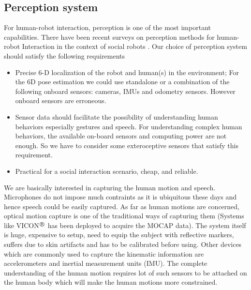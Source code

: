 \subsection{Perception system}
\label{ssec:perception}
For human-robot interaction, perception is one of the most important capabilities. There have been recent surveys on perception methods for human-robot Interaction in the context of social robots \cite{yan2014survey}. Our choice of perception system should satisfy the following requirements
\begin{itemize}
\item Precise 6-D localization of the robot and human(s) in the environment; For the 6D pose estimation we could use standalone or a combination of the following onboard sensors: cameras, IMUs and odometry sensors. However onboard sensors are erroneous.
\item Sensor data should facilitate the possibility of understanding human behaviors especially gestures and speech. For understanding complex human behaviors, the available on-board sensors and computing power are not enough. So we have to consider some exteroceptive sensors that satisfy this requirement. 
\item Practical for a social interaction scenario, cheap, and reliable.
\end{itemize}
We are basically interested in capturing the human motion and speech. Microphones do not impose much contraints as it is ubiquitous these days and hence speech could be easily captured. As far as human motions are concerned, optical motion capture is one of the traditional ways of capturing them (Systems like VICON$^{\regmark}$ has been deployed to acquire the MOCAP data). The system itself is huge, expensive to setup, need to equip the subject with reflective markers, suffers due to skin artifacts and has to be calibrated before using. Other devices which are commonly used to capture the kinematic information are accelerometers and inertial measurement units (IMU). The complete understanding of the human motion requires lot of such sensors to be attached on the human body which will make the human motions more constrained. 


